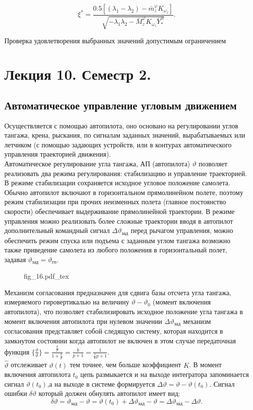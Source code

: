 \documentclass{article}
\begin{document}
\[
	\xi^* = \frac{0.5[(\lambda_1 - \lambda_2) - \bar{m}_z^\varphi
				K_{\omega_z}]}{\sqrt{-\lambda_1\lambda_2 - \bar{M}_z^\varphi
			K_{\omega_z}\bar{Y}_*^\alpha }}.
\]

Проверка удовлетворения выбранных значений допустимым ограничением

\section{Лекция 10. Семестр 2.}
\subsection{Автоматическое управление угловым движением}
Осуществляется с помощью автопилота, оно основано на регулировании углов
тангажа, крена, рыскания, по сигналам заданных значений, вырабатываемых или
летчиком (с помощью задающих устройств, или в контурах автоматического
управления траекторией движения).\\
Автоматическое регулирование угла тангажа, АП (автопилота) $\vartheta$ позволяет
реализовать два режима регулирования: стабилизацию и управление траекторией.\\
В режиме стабилизации сохраняется исходное угловое положение самолета. Обычно
автопилот включают в горизонтальном прямолинейном полете, поэтому режим
стабилизации при прочих неизменных полета (главное постоянство скорости)
обеспечивает выдерживание прямолинейной траектории. В режиме управления можно
реализовать более сложные траектории вводя в автопилот дополнительный командный
сигнал $\Delta \vartheta_\text{зад}$ перед рычагом управления, можно обеспечить
режим спуска или подъема с заданным углом тангажа возможно также приведение
самолета из любого положения в горизонтальный полет, задавая
$\vartheta_\text{зад} = \vartheta_\text{гп}$.

\begin{figure}[ht]
	\centering
	{fig_16.pdf_tex}
\end{figure}

Механизм согласования предназначен для сдвига базы отсчета угла тангажа,
измеряемого гировертикалью на величину $\vartheta - \vartheta_0$ (момент
включения автопилота), что позволяет стабилизировать исходное положение угла
тангажа в момент включения автопилота при нулевом значении $\Delta
	\vartheta_\text{зад}$ механизм согласования представляет собой следящую
систему, которая находится в замкнутом состоянии когда автопилот не включен в
этом случае передаточная функция $\{{\frac{\hat{\vartheta}}{\vartheta}}\}=
	\frac{\frac{k}{p}}{1 + \frac{k}{p}} =\frac{k}{p+1}=\frac{1}{\frac{1}{k}p +
		1}$.\\
$\hat{\vartheta}$ отслеживает $\vartheta(t)$ тем точнее, чем больше коэффициент
$K$. В момент включения автопилота $t_0$ цепь размыкается и на выходе
интегратора запоминается сигнал $\vartheta(t_0)$,а на выходе в системе
формируется $\Delta \vartheta = \vartheta - \vartheta(t_0)$. Сигнал ошибки
$\delta \vartheta $ который должен обнулять автопилот имеет вид:
\[
	\delta \vartheta = \vartheta_\text{зад} - \vartheta = \vartheta(t_0) +
	\Delta \vartheta_\text{зад} - \vartheta = \Delta \vartheta_\text{зад} -
	\Delta \vartheta.
\]
\end{document}
